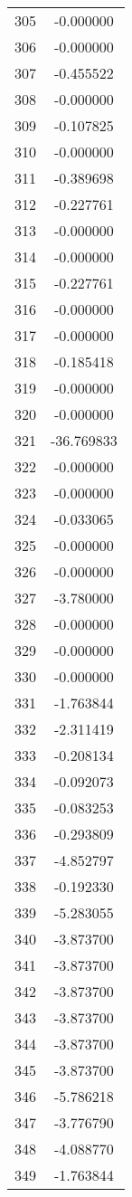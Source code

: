 \documentclass[12pt]{article}
\begin{document}
\begin{longtable}{@{}cc@{}}
305 & -0.000000 \\
306 & -0.000000 \\
307 & -0.455522 \\
308 & -0.000000 \\
309 & -0.107825 \\
310 & -0.000000 \\
311 & -0.389698 \\
312 & -0.227761 \\
313 & -0.000000 \\
314 & -0.000000 \\
315 & -0.227761 \\
316 & -0.000000 \\
317 & -0.000000 \\
318 & -0.185418 \\
319 & -0.000000 \\
320 & -0.000000 \\
321 & -36.769833 \\
322 & -0.000000 \\
323 & -0.000000 \\
324 & -0.033065 \\
325 & -0.000000 \\
326 & -0.000000 \\
327 & -3.780000 \\
328 & -0.000000 \\
329 & -0.000000 \\
330 & -0.000000 \\
331 & -1.763844 \\
332 & -2.311419 \\
333 & -0.208134 \\
334 & -0.092073 \\
335 & -0.083253 \\
336 & -0.293809 \\
337 & -4.852797 \\
338 & -0.192330 \\
339 & -5.283055 \\
340 & -3.873700 \\
341 & -3.873700 \\
342 & -3.873700 \\
343 & -3.873700 \\
344 & -3.873700 \\
345 & -3.873700 \\
346 & -5.786218 \\
347 & -3.776790 \\
348 & -4.088770 \\
349 & -1.763844 \\

\end{longtable}
\end{document}
